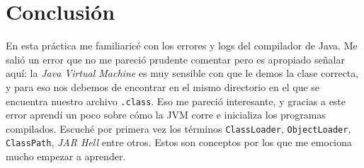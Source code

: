 \documentclass{article}
\begin{document}
	\section*{Conclusión}
		En esta práctica me familiaricé con los errores y logs del compilador de Java. Me salió un error que no me pareció prudente comentar pero es apropiado señalar aquí: la \textit{Java Virtual Machine} es muy sensible con que le demos la clase correcta, y para eso nos debemos de encontrar en el mismo directorio en el que se encuentra nuestro archivo \texttt{.class}. Eso me pareció interesante, y gracias a este error aprendí un poco sobre cómo la JVM corre e inicializa los programas compilados. Escuché por primera vez los términos \texttt{ClassLoader}, \texttt{ObjectLoader}, \texttt{ClassPath}, \textit{JAR Hell} entre otros. Estos son conceptos por los que me emociona mucho empezar a aprender.
\end{document}
